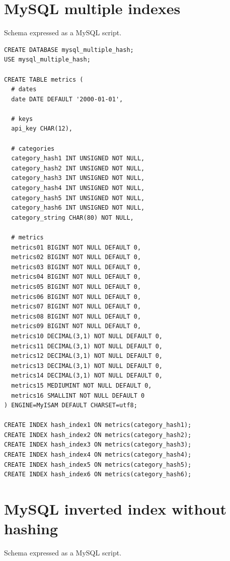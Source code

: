 \section{MySQL multiple indexes}

Schema expressed as a MySQL script.

\begin{verbatim}
CREATE DATABASE mysql_multiple_hash;
USE mysql_multiple_hash;

CREATE TABLE metrics ( 
  # dates
  date DATE DEFAULT '2000-01-01',

  # keys
  api_key CHAR(12),

  # categories  
  category_hash1 INT UNSIGNED NOT NULL,
  category_hash2 INT UNSIGNED NOT NULL,
  category_hash3 INT UNSIGNED NOT NULL,
  category_hash4 INT UNSIGNED NOT NULL,
  category_hash5 INT UNSIGNED NOT NULL,
  category_hash6 INT UNSIGNED NOT NULL,
  category_string CHAR(80) NOT NULL,

  # metrics
  metrics01 BIGINT NOT NULL DEFAULT 0,
  metrics02 BIGINT NOT NULL DEFAULT 0,
  metrics03 BIGINT NOT NULL DEFAULT 0,
  metrics04 BIGINT NOT NULL DEFAULT 0,
  metrics05 BIGINT NOT NULL DEFAULT 0,
  metrics06 BIGINT NOT NULL DEFAULT 0,
  metrics07 BIGINT NOT NULL DEFAULT 0,
  metrics08 BIGINT NOT NULL DEFAULT 0,
  metrics09 BIGINT NOT NULL DEFAULT 0,
  metrics10 DECIMAL(3,1) NOT NULL DEFAULT 0,
  metrics11 DECIMAL(3,1) NOT NULL DEFAULT 0,
  metrics12 DECIMAL(3,1) NOT NULL DEFAULT 0,
  metrics13 DECIMAL(3,1) NOT NULL DEFAULT 0,
  metrics14 DECIMAL(3,1) NOT NULL DEFAULT 0,
  metrics15 MEDIUMINT NOT NULL DEFAULT 0,
  metrics16 SMALLINT NOT NULL DEFAULT 0
) ENGINE=MyISAM DEFAULT CHARSET=utf8;
 
CREATE INDEX hash_index1 ON metrics(category_hash1);
CREATE INDEX hash_index2 ON metrics(category_hash2);
CREATE INDEX hash_index3 ON metrics(category_hash3);
CREATE INDEX hash_index4 ON metrics(category_hash4);
CREATE INDEX hash_index5 ON metrics(category_hash5);
CREATE INDEX hash_index6 ON metrics(category_hash6);
\end{verbatim}

\section{MySQL inverted index without hashing}

Schema expressed as a MySQL script.

